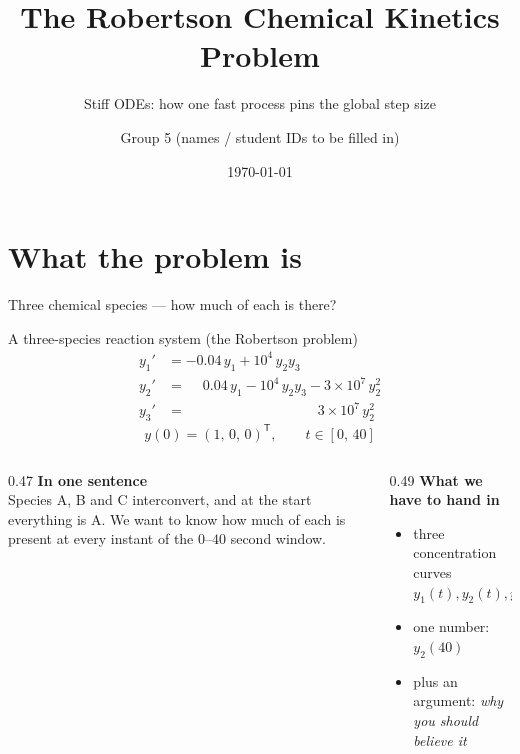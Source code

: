 \documentclass[aspectratio=169,10pt]{beamer}
\title[Robertson Problem]{The Robertson Chemical Kinetics Problem}
\subtitle{Stiff ODEs: how one fast process pins the global step size}
\author[Group 5]{Group 5 \quad\footnotesize(names / student IDs to be filled in)}
\institute[Project 1 -- Topic 3]{Numerical Analysis of ODEs and PDEs --- Project 1, Topic 3}
\date[\the\year]{\today}
\begin{document}
\maketitle

\section{What the problem is}

\begin{frame}{Three chemical species --- how much of each is there?}
  \begin{block}{A three-species reaction system (the Robertson problem)}
    \begin{align*}
      y_1' &= -0.04\,y_1 + 10^{4}\,y_2 y_3 \\
      y_2' &= \phantom{-}0.04\,y_1 - 10^{4}\,y_2 y_3 - 3\times 10^{7}\,y_2^{2} \\
      y_3' &= \phantom{-0.04\,y_1 - 10^{4}\,y_2 y_3 +{}} 3\times 10^{7}\,y_2^{2}
    \end{align*}
    \[
      y(0)=(1,\,0,\,0)^{\mathsf T},\qquad t\in[0,\,40]
    \]
  \end{block}

  \begin{columns}[T]
    \begin{column}{0.47\textwidth}
      \textbf{In one sentence}\\[0.3em]
      Species A, B and C interconvert, and at the start everything is A.
      We want to know how much of each is present at
      \alert{every instant} of the $0$--$40$ second window.
    \end{column}
    \begin{column}{0.49\textwidth}
      \textbf{What we have to hand in}\\[0.3em]
      \begin{itemize}
        \item three concentration curves $y_1(t),y_2(t),y_3(t)$
        \item one number: \alert{$y_2(40)$}
        \item plus an argument: \emph{why you should believe it}
      \end{itemize}
    \end{column}
  \end{columns}
\end{frame}
\end{document}
